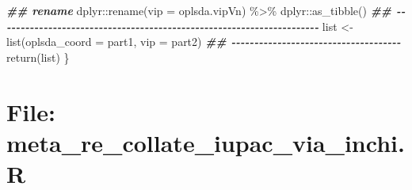 \documentclass[
]{article}
\newenvironment{Shaded}{\begin{snugshade}}{\end{snugshade}}
\newcommand{\AttributeTok}[1]{\textcolor[rgb]{0.77,0.63,0.00}{#1}}
\newcommand{\DocumentationTok}[1]{\textcolor[rgb]{0.56,0.35,0.01}{\textbf{\textit{#1}}}}
\newcommand{\FunctionTok}[1]{\textcolor[rgb]{0.00,0.00,0.00}{#1}}
\newcommand{\NormalTok}[1]{#1}
\newcommand{\OtherTok}[1]{\textcolor[rgb]{0.56,0.35,0.01}{#1}}
\newcommand{\SpecialCharTok}[1]{\textcolor[rgb]{0.00,0.00,0.00}{#1}}
\begin{document}
\begin{Shaded}
\begin{Highlighting}[]
      \DocumentationTok{\#\# rename}
\NormalTok{      dplyr}\SpecialCharTok{::}\FunctionTok{rename}\NormalTok{(}\AttributeTok{vip =}\NormalTok{ oplsda.vipVn) }\SpecialCharTok{\%\textgreater{}\%}
\NormalTok{      dplyr}\SpecialCharTok{::}\FunctionTok{as\_tibble}\NormalTok{()}
    \DocumentationTok{\#\# {-}{-}{-}{-}{-}{-}{-}{-}{-}{-}{-}{-}{-}{-}{-}{-}{-}{-}{-}{-}{-}{-}{-}{-}{-}{-}{-}{-}{-}{-}{-}{-}{-}{-}{-}{-}{-}{-}{-}{-}{-}{-}{-}{-}{-}{-}{-}{-}{-}{-}{-}{-}{-}{-}{-}{-}{-}{-}{-}{-}{-}{-}{-}{-}{-}{-}{-}{-}{-}{-} }
\NormalTok{    list }\OtherTok{\textless{}{-}} \FunctionTok{list}\NormalTok{(}\AttributeTok{oplsda\_coord =}\NormalTok{ part1, }\AttributeTok{vip =}\NormalTok{ part2)}
    \DocumentationTok{\#\# {-}{-}{-}{-}{-}{-}{-}{-}{-}{-}{-}{-}{-}{-}{-}{-}{-}{-}{-}{-}{-}{-}{-}{-}{-}{-}{-}{-}{-}{-}{-}{-}{-}{-}{-}{-}{-}}
    \FunctionTok{return}\NormalTok{(list)}
\NormalTok{  \}}
\end{Highlighting}
\end{Shaded}

\hypertarget{file-meta_re_collate_iupac_via_inchi.r}{%
\section{File: meta\_re\_collate\_iupac\_via\_inchi.R}\label{file-meta_re_collate_iupac_via_inchi.r}}
\end{document}
